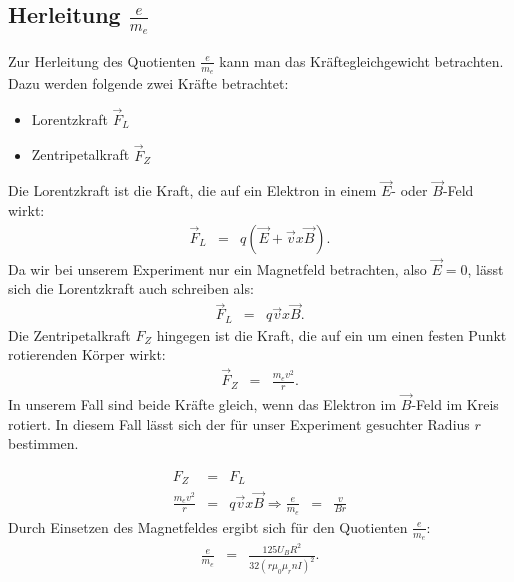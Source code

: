 \documentclass[12pt,a4paper]{article}
\renewcommand{\*}{\cdot}
\begin{document}
\subsection{Herleitung $\frac{e}{m_e}$}
Zur Herleitung des Quotienten $\frac{e}{m_e}$ kann man das Kräftegleichgewicht betrachten. Dazu werden folgende zwei Kräfte betrachtet:
\begin{itemize}
\item Lorentzkraft $\vec{F}_L$
\item Zentripetalkraft $\vec{F}_Z$
\end{itemize}
Die Lorentzkraft ist die Kraft, die auf ein Elektron in einem $\vec{E}$- oder $\vec{B}$-Feld wirkt:
\begin{align*}
\vec{F}_L&=&q\left(\vec{E}+\vec{v}x\vec{B}\right)\text{.}
\end{align*}
Da wir bei unserem Experiment nur ein Magnetfeld betrachten, also $\vec{E}=0$, lässt sich die Lorentzkraft auch schreiben als:
\begin{align}
\vec{F}_L&=&q\vec{v}x\vec{B}.
\end{align}
Die Zentripetalkraft $F_Z$ hingegen ist die Kraft, die auf ein um einen festen Punkt rotierenden Körper wirkt:
\begin{align}
\vec{F}_Z&=&\frac{m_ev^2}{r}\text{.}
\end{align}
In unserem Fall sind beide Kräfte gleich, wenn das Elektron im $\vec{B}$-Feld im Kreis rotiert. In diesem Fall lässt sich der für
unser Experiment gesuchter Radius $r$ bestimmen.

\begin{align}
F_Z&=&F_L \\
\frac{m_ev^2}{r}&=&q\vec{v}x\vec{B}
\Rightarrow \frac{e}{m_e}&=&\frac{v}{Br}
\end{align}
Durch Einsetzen des Magnetfeldes ergibt sich für den Quotienten $\frac{e}{m_e}$:
\begin{align}
\frac{e}{m_e}&=&\frac{125U_BR^2}{32\left(r\mu_0\mu_rnI\right)^2}\text{.}
\end{align}
\end{document}
